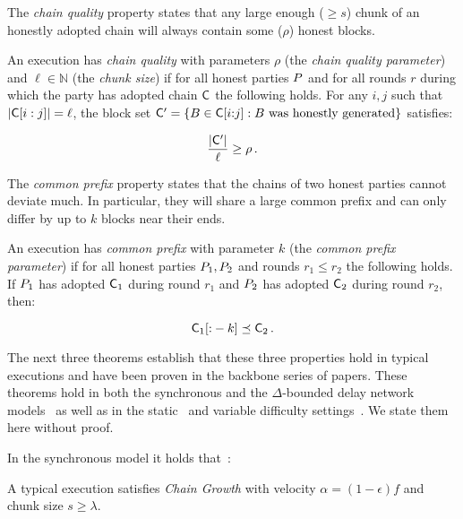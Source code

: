 The \emph{chain quality} property states that any large enough ($\geq s$) chunk
of an honestly adopted chain will always contain some ($\rho$) honest blocks.

\begin{definition}
  An execution has \emph{chain quality} with parameters $\rho$ (the
  \emph{chain quality parameter}) and $\ell \in \mathbb{N}$ (the \emph{chunk size})
  if for all honest parties $P$ and for all rounds $r$ during which the
  party has adopted chain $\mathsf{C}$ the following holds. For any $i, j$ such that
  $|\mathsf{C}[i:j]| = \ell$, the block set $\mathsf{C}' = \{B \in \mathsf{C}[i{:}j]: B \text{
  was honestly generated}\}$ satisfies:

  \[
  \frac{|\mathsf{C}'|}{\ell} \geq \rho
  \,.
  \]
\end{definition}

The \emph{common prefix} property states that the chains of two honest parties
cannot deviate much. In particular, they will share a large common prefix and
can only differ by up to $k$ blocks near their ends.

\begin{definition}
  An execution has \emph{common prefix} with parameter $k$ (the \emph{common
  prefix parameter}) if for all honest parties $P_1, P_2$ and rounds
  $r_1 \leq r_2$ the following holds. If $P_1$ has adopted $\mathsf{C}_1$
  during round $r_1$ and $P_2$ has adopted $\mathsf{C}_2$ during round $r_2$,
  then:

  \[
  \mathsf{C}_1[{:}-k] \preceq \mathsf{C}_2
  \,.
  \]
\end{definition}

The next three theorems establish that these three properties hold in typical
executions and have been proven in the backbone series of papers. These theorems
hold in both the synchronous and the $\Delta$-bounded delay network
models~\cite{pass-asynchronous} as well as in the static~\cite{backbone} and
variable difficulty settings~\cite{varbackbone}. We state them here without
proof.

In the synchronous model it holds that~\cite{backbone}:

\begin{theorem}
  A typical execution satisfies \emph{Chain Growth} with
  velocity $\alpha = (1 - \epsilon)f$ and chunk size $s \geq \lambda$.
\end{theorem}

